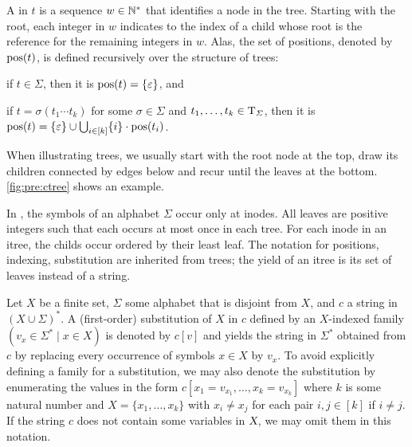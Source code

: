 \documentclass[../document.tex]{subfiles}
\begin{document}
    A  in \(t\) is a sequence $w \in \mathbb{N}^*$ that identifies a node in the tree.
    Starting with the root, each integer in \(w\) indicates to the index of a child whose root is the reference for the remaining integers in \(w\).
    Alas, the set of positions, denoted by \(\operatorname{pos}(t)\), is defined recursively over the structure of trees:
    \begin{inparaenum}
        \item if \(t \in \varSigma\), then it is \(\operatorname{pos}(t) = \{\varepsilon\}\), and
        \item if \(t = \sigma(t_1 \cdots t_k)\) for some \(\sigma\in \varSigma\) and \(t_1, \ldots, t_k \in \operatorname{T}_\varSigma\), then it is \(\operatorname{pos}(t) = \{\varepsilon\} \cup \bigcup_{i\in[k]} \{i\}\cdot \operatorname{pos}(t_i)\).
    \end{inparaenum}
    When illustrating trees, we usually start with the root node at the top, draw its children connected by edges below and recur until the leaves at the bottom.
    \cref{fig:pre:ctree} shows an example.

    In , the symbols of an alphabet \(\varSigma\) occur only at \glspl*{inode}.
    All leaves are positive integers such that each occurs at most once in each \gls*{tree}.
    For each \gls*{inode} in an \gls*{itree}, the \glspl{child} occur ordered by their least \gls*{leaf}.
    The notation for positions, indexing, substitution are inherited from trees; the yield of an \gls*{itree} is its set of leaves instead of a string.

    Let \(X\) be a finite set, \(\varSigma\) some alphabet that is disjoint from \(X\), and \(c\) a string in \((X \cup \varSigma)^*\).
    A (first-order) substitution of \(X\) in \(c\) defined by an \(X\)-indexed family \((v_x \in \varSigma^* \mid x \in X)\) is denoted by \(c[v]\) and yields the string in \(\varSigma^*\) obtained from \(c\) by replacing every occurrence of symbols \(x \in X\) by \(v_x\).
    To avoid explicitly defining a family for a substitution, we may also denote the substitution by enumerating the values in the form \(c[x_1=v_{x_1}, \ldots, x_{k}=v_{x_k}]\) where \(k\) is some natural number and \(X = \{x_1, \ldots, x_k\}\) with \(x_i \neq x_j\) for each pair \(i,j \in [k]\) if \(i\neq j\).
    If the string \(c\) does not contain some variables in \(\textsl{X}\), we may omit them in this notation.
\end{document}

